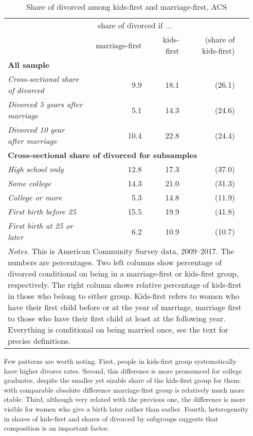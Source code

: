 \documentclass[12pt,letter]{article}
\begin{document}
\begin{table}[h]
\caption{Share of divorced among kids-first and marriage-first, ACS\label{share_table_0}}
\begin{tabular}{l r r r r }
\hline
& \multicolumn{2}{c}{share of divorced if ... }&  \\
&  marriage-first & kids-first & (share of kids-first) &  \\\hline
\multicolumn{5}{l}{\textbf{All sample}} \\\hline
\textit{Cross-sectional share of divorced} &  9.9 & 18.1 & (26.1) \\
\textit{Divorced 5 years after marriage} &  5.1 & 14.3  & (24.6) \\
\textit{Divorced 10 year after marriage} & 10.4 & 22.8 & (24.4) \\\hline
\multicolumn{5}{l}{\textbf{Cross-sectional share of divorced for subsamples}} \\\hline
\textit{High school only} &  12.8 & 17.3 & (37.0) \\
\textit{Some college} & 14.3 & 21.0 & (31.3) \\
\textit{College or more} &   5.3 & 14.8 & (11.9) \\\hline
\textit{First birth before 25} & 15.5 & 19.9 & (41.8) \\
\textit{First birth at 25 or later} &  6.2 & 10.9 & (10.7)  \\\hline
 \multicolumn{5}{p{0.9\linewidth}}{\footnotesize \textit{Notes.} This is American Community Survey data, 2009--2017. The numbers are percentages. Two left columns show percentage of divorced conditional on being in a marriage-first or kids-first group, respectively. The right column shows relative percentage of kids-first in those who belong to either group. Kids-first refers to women who have their first child before or at the year of marriage, marriage first to those who have their first child at least at the following year. Everything is conditional on being married once, see the text for precise definitions. }\\\hline\hline
\end{tabular}
\end{table}

Few patterns are worth noting. First, people in kids-first group systematically have higher divorce rates. Second, this difference is more pronounced for college graduates, despite the smaller yet sizable share of the kids-first group for them: with comparable absolute difference marriage-first group is relatively much more stable. Third, although very related with the previous one, the difference is more visible for women who give a birth later rather than earlier. Fourth, heterogeneity in shares of kids-first and shares of divorced by subgroups suggests that composition is an important factor. 
\end{document}
